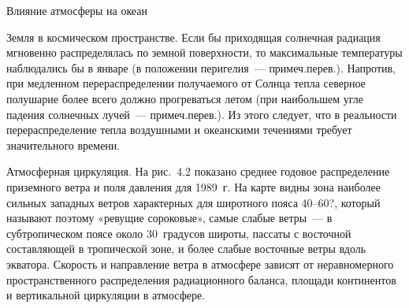 \begin{chapter}{Влияние атмосферы на океан}
\begin{section}{Земля в космическом пространстве.}
Если бы приходящая солнечная радиация мгновенно распределялась по
земной поверхности, то максимальные температуры наблюдались бы в
январе (в положении перигелия~--- примеч.перев.). Напротив, при
медленном перераспределении получаемого от Солнца тепла северное
полушарие более всего должно прогреваться летом (при наибольшем угле
падения солнечных лучей~--- примеч.перев.). Из этого следует, что в
реальности перераспределение тепла воздушными и океанскими течениями
требует значительного времени.
%
\end{section}

\begin{section}{Атмосферная циркуляция.}
На рис.~4.2 показано среднее годовое распределение приземного ветра и
поля давления для 1989~г. На карте видны зона наиболее сильных
западных ветров характерных для широтного пояса 40--60?, который
называют поэтому «ревущие сороковые», самые слабые ветры~--- в
субтропическом поясе около 30~градусов широты, пассаты с восточной
составляющей в тропической зоне, и более слабые восточные ветры вдоль
экватора. Скорость и направление ветра в атмосфере зависят от
неравномерного пространственного распределения радиационного баланса,
площади континентов и вертикальной циркуляции в атмосфере.
%



\end{section}
\end{chapter}
